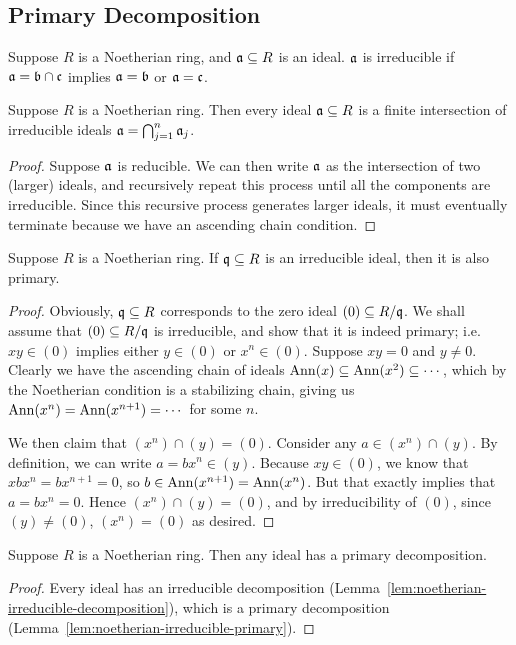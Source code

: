 \subsection*{Primary Decomposition}

\begin{definition}
    Suppose \(R\) is a Noetherian ring, and \(\mathfrak{a} \subseteq R\) is an ideal.
    \(\mathfrak{a}\) is irreducible if \(\mathfrak{a} = \mathfrak{b} \cap \mathfrak{c}\)
    implies \(\mathfrak{a} = \mathfrak{b}\) or \(\mathfrak{a} = \mathfrak{c}\).
\end{definition}
\begin{lemma}\label{lem:noetherian-irreducible-decomposition}
    Suppose \(R\) is a Noetherian ring.
    Then every ideal \(\mathfrak{a} \subseteq R\) is a finite intersection of irreducible ideals
    \(\mathfrak{a} = \bigcap_{j=1}^n \mathfrak{a}_j\).
\end{lemma}
\begin{proof}
    Suppose \(\mathfrak{a}\) is reducible.
    We can then write \(\mathfrak{a}\) as the intersection of two (larger) ideals,
    and recursively repeat this process until all the components are irreducible.
    Since this recursive process generates larger ideals,
    it must eventually terminate because we have an ascending chain condition.
\end{proof}
\begin{lemma}\label{lem:noetherian-irreducible-primary}
    Suppose \(R\) is a Noetherian ring.
    If \(\mathfrak{q} \subseteq R\) is an irreducible ideal,
    then it is also primary.
\end{lemma}
\begin{proof}
    Obviously, \(\mathfrak{q} \subseteq R\) corresponds to the zero ideal \((0) \subseteq R/\mathfrak{q}\).
    We shall assume that \((0) \subseteq R/\mathfrak{q}\) is irreducible,
    and show that it is indeed primary; i.e.\ \(xy \in (0)\) implies either \(y \in (0)\) or \(x^n \in (0)\).
    Suppose \(xy = 0\) and \(y \neq 0\).
    Clearly we have the ascending chain of ideals \(\operatorname{Ann}(x) \subseteq \operatorname{Ann}(x^2) \subseteq \cdots\),
    which by the Noetherian condition is a stabilizing chain,
    giving us \(\operatorname{Ann}(x^n) = \operatorname{Ann}(x^{n+1}) = \cdots\) for some \(n\).

    We then claim that \((x^n) \cap (y) = (0)\).
    Consider any \(a \in (x^n) \cap (y)\).
    By definition, we can write \(a = bx^n \in (y)\).
    Because \(xy \in (0)\), we know that \(xbx^n = bx^{n+1} = 0\), so \(b \in \operatorname{Ann}(x^{n+1}) = \operatorname{Ann}(x^n)\).
    But that exactly implies that \(a = bx^n = 0\).
    Hence \((x^n) \cap (y) = (0)\), and by irreducibility of \((0)\),
    since \((y) \neq (0)\), \((x^n) = (0)\) as desired.
\end{proof}
\begin{theorem}
    Suppose \(R\) is a Noetherian ring.
    Then any ideal has a primary decomposition.
\end{theorem}
\begin{proof}
    Every ideal has an irreducible decomposition (Lemma~\ref{lem:noetherian-irreducible-decomposition}),
    which is a primary decomposition (Lemma~\ref{lem:noetherian-irreducible-primary}).
\end{proof}

